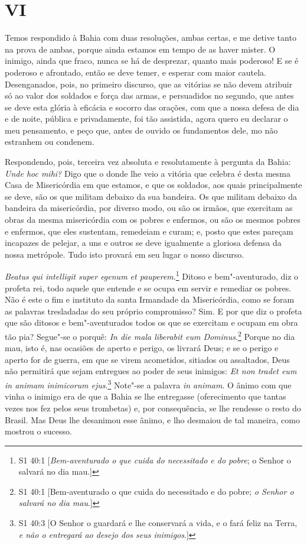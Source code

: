\section*{VI}

Temos respondido à Bahia com duas resoluções, ambas certas, e me detive
tanto na prova de ambas, porque ainda estamos em tempo de as haver
mister. O inimigo, ainda que fraco, nunca se há de desprezar, quanto
mais poderoso! E se é poderoso e afrontado, então se deve temer, e
esperar com maior cautela. Desenganados, pois, no primeiro discurso, que
as vitórias se não devem atribuir só ao valor dos soldados e força das
armas, e persuadidos no segundo, que antes se deve esta glória à
eficácia e socorro das orações, com que a nossa defesa de dia e de
noite, pública e privadamente, foi tão assistida, agora quero eu
declarar o meu pensamento, e peço que, antes de ouvido os fundamentos
dele, mo não estranhem ou condenem.

Respondendo, pois, terceira vez absoluta e resolutamente à pergunta da
Bahia: \emph{Unde hoc mihi?} Digo que o donde lhe veio a vitória que
celebra é desta mesma Casa de Misericórdia em que estamos, e que os
soldados, aos quais principalmente se deve, são os que militam debaixo
da sua bandeira. Os que militam debaixo da bandeira da misericórdia, por
diverso modo, ou são os irmãos, que exercitam as obras da mesma
misericórdia com os pobres e enfermos, ou são os mesmos pobres e
enfermos, que eles sustentam, remedeiam e curam; e, posto que estes
pareçam incapazes de pelejar, a uns e outros se deve igualmente a
gloriosa defensa da nossa metrópole.
Tudo isto provará em seu lugar o nosso discurso.

\emph{Beatus qui intelligit super egenum et pauperem}.\footnote{S1 40:1 [\textit{Bem-aventurado o que cuida do necessitado e do pobre}; o Senhor o salvará no dia mau.]} Ditoso e bem"-aventurado,
diz o profeta rei, todo aquele que entende e se ocupa em servir e
remediar os pobres. Não é este o fim e instituto da santa Irmandade
da Misericórdia, como se foram as palavras tresladadas do seu próprio
compromisso? Sim. E por que diz o profeta que são ditosos e
bem"-aventurados todos os que se exercitam e ocupam em obra tão pia?
Segue"-se o porquê: \emph{In die mala liberabit eum Dominus}.\footnote{S1 40:1 [Bem-aventurado o que cuida do necessitado e do pobre; \textit{o Senhor o salvará no dia mau}.]}
Porque no dia mau, isto é, nas ocasiões de aperto e perigo, os
livrará Deus; e se o perigo e aperto for de guerra, em que se virem
acometidos, sitiados ou assaltados, Deus não permitirá que sejam
entregues ao poder de seus inimigos: \emph{Et non tradet eum in animam
inimicorum ejus}.\footnote{S1 40:3 [O Senhor o guardará e lhe conservará a vida, e o fará feliz na Terra, \textit{e não o entregará ao desejo dos seus inimigos}.]} Note"-se a palavra \emph{in animam}. O ânimo
com que vinha o inimigo era de que a Bahia se lhe entregasse
(oferecimento que tantas vezes nos fez pelos seus trombetas) e, por
consequência, se lhe rendesse o resto do Brasil. Mas Deus lhe
desanimou esse ânimo, e lho desmaiou de tal maneira, como mostrou o
sucesso.


